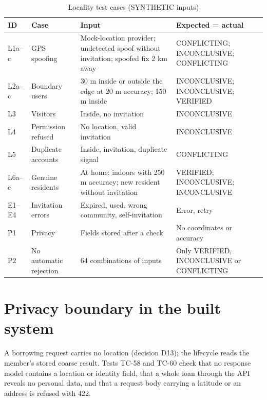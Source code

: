 \begin{table}[!htbp]
\centering
\caption{Locality test cases (SYNTHETIC inputs)}\label{tab:locality-test-cases-synthetic}
\begin{tabular}{@{}L{26pt}L{98pt}L{149pt}L{90pt}@{}}
\toprule
ID & Case & Input & Expected = actual \\
\midrule
L1a--c & GPS spoofing & Mock-location provider; undetected spoof without invitation; spoofed fix 2 km away & CONFLICTING; INCONCLUSIVE; CONFLICTING \\
L2a--c & Boundary users & 30 m inside or outside the edge at 20 m accuracy; 150 m inside & INCONCLUSIVE; INCONCLUSIVE; VERIFIED \\
L3 & Visitors & Inside, no invitation & INCONCLUSIVE \\
L4 & Permission refused & No location, valid invitation & INCONCLUSIVE \\
L5 & Duplicate accounts & Inside, invitation, duplicate signal & CONFLICTING \\
L6a--c & Genuine residents & At home; indoors with 250 m accuracy; new resident without invitation & VERIFIED; INCONCLUSIVE; INCONCLUSIVE \\
E1--E4 & Invitation errors & Expired, used, wrong community, self-invitation & Error, retry \\
P1 & Privacy & Fields stored after a check & No coordinates or accuracy \\
P2 & No automatic rejection & 64 combinations of inputs & Only VERIFIED, INCONCLUSIVE or CONFLICTING \\
\bottomrule
\end{tabular}
\end{table}
\section{Privacy boundary in the built system}\label{sec:privacy-boundary-built-system}
A borrowing request carries no location (decision D13); the lifecycle reads the member's stored coarse result. Tests TC-58 and TC-60 check that no response model contains a location or identity field, that a whole loan through the API reveals no personal data, and that a request body carrying a latitude or an address is refused with 422.
